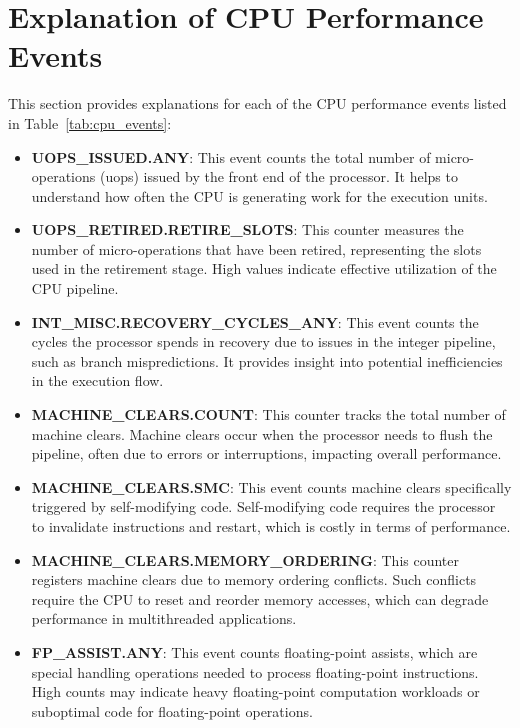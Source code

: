 \section{Explanation of CPU Performance Events}\label{sec:hpc_descriptions}
This section provides explanations for each of the CPU performance events listed in Table~\ref{tab:cpu_events}:

\begin{itemize}
    \item \textbf{UOPS\_ISSUED.ANY}: This event counts the total number of micro-operations (uops) issued by the front end of the processor. It helps to understand how often the CPU is generating work for the execution units.

    \item \textbf{UOPS\_RETIRED.RETIRE\_SLOTS}: This counter measures the number of micro-operations that have been retired, representing the slots used in the retirement stage. High values indicate effective utilization of the CPU pipeline.

    \item \textbf{INT\_MISC.RECOVERY\_CYCLES\_ANY}: This event counts the cycles the processor spends in recovery due to issues in the integer pipeline, such as branch mispredictions. It provides insight into potential inefficiencies in the execution flow.

    \item \textbf{MACHINE\_CLEARS.COUNT}: This counter tracks the total number of machine clears. Machine clears occur when the processor needs to flush the pipeline, often due to errors or interruptions, impacting overall performance.

    \item \textbf{MACHINE\_CLEARS.SMC}: This event counts machine clears specifically triggered by self-modifying code. Self-modifying code requires the processor to invalidate instructions and restart, which is costly in terms of performance.

    \item \textbf{MACHINE\_CLEARS.MEMORY\_ORDERING}: This counter registers machine clears due to memory ordering conflicts. Such conflicts require the CPU to reset and reorder memory accesses, which can degrade performance in multithreaded applications.

    \item \textbf{FP\_ASSIST.ANY}: This event counts floating-point assists, which are special handling operations needed to process floating-point instructions. High counts may indicate heavy floating-point computation workloads or suboptimal code for floating-point operations.


\end{itemize}

